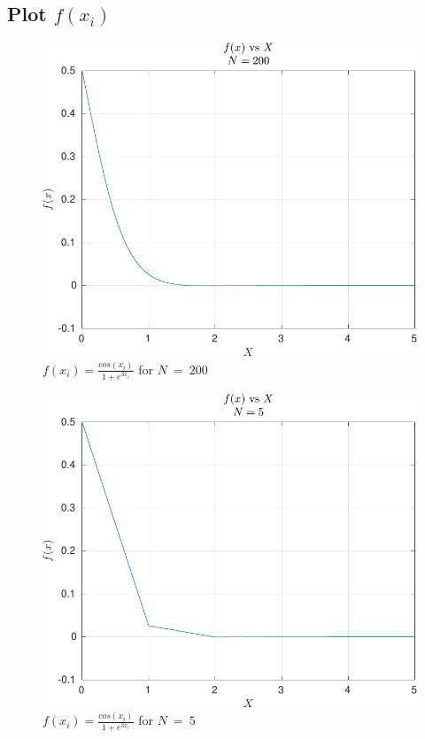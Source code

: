 \documentclass[12pt]{article}
\begin{document}
		\subsection{Plot $f(x_{i})$}
			
			
			\begin{figure}[H]
				\centering
				\includegraphics[width=1\linewidth]{Code/Fig/fx_200.pdf}
				\caption{\Large $f(x_{i}) = \frac{cos(x_{i})}{1 + e^{3x_{i}}}$ for $N \ = \ 200$}
				\label{fig:fx200}
			\end{figure}
			
			\begin{figure}[H]
				\centering
				\includegraphics[width=1\linewidth]{Code/Fig/fx_5.pdf}
				\caption{\Large $f(x_{i}) = \frac{cos(x_{i})}{1 + e^{3x_{i}}}$ for $N \ = \ 5$}
				\label{fig:fx5}
			\end{figure}
			
\end{document}
